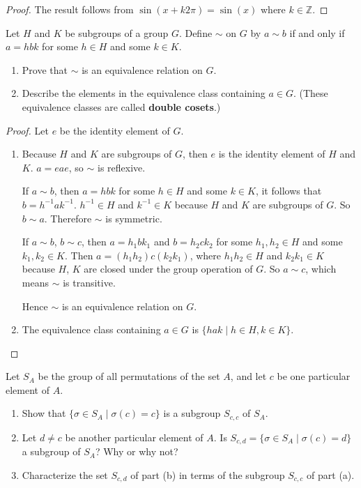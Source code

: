 \begin{proof}
    The result follows from $\sin(x + k2\pi) = \sin(x)$ where $k\in\mathbb{Z}$.
\end{proof}

\newpage
\begin{exercise}
    Let $H$ and $K$ be subgroups of a group $G$. Define $\sim$ on $G$ by $a\sim b$ if and only if $a = hbk$ for some $h\in H$ and some $k\in K$.
    \begin{enumerate}[label={\textbf{\alph*.}}]
        \item Prove that $\sim$ is an equivalence relation on $G$.
        \item Describe the elements in the equivalence class containing $a\in G$. (These equivalence classes are called \textbf{double cosets}.)
    \end{enumerate}
\end{exercise}

\begin{proof}
    Let $e$ be the identity element of $G$.
    \begin{enumerate}[label={\textbf{\alph*.}}]
        \item Because $H$ and $K$ are subgroups of $G$, then $e$ is the identity element of $H$ and $K$. $a = eae$, so $\sim$ is reflexive.

              If $a\sim b$, then $a = hbk$ for some $h\in H$ and some $k\in K$, it follows that $b = h^{-1}ak^{-1}$. $h^{-1}\in H$ and $k^{-1}\in K$ because $H$ and $K$ are subgroups of $G$. So $b\sim a$. Therefore $\sim$ is symmetric.

              If $a\sim b$, $b\sim c$, then $a = h_{1}bk_{1}$ and $b = h_{2}ck_{2}$ for some $h_{1}, h_{2}\in H$ and some $k_{1}, k_{2}\in K$. Then $a = (h_{1}h_{2})c(k_{2}k_{1})$, where $h_{1}h_{2}\in H$ and $k_{2}k_{1}\in K$ because $H$, $K$ are closed under the group operation of $G$. So $a\sim c$, which means $\sim$ is transitive.

              Hence $\sim$ is an equivalence relation on $G$.
        \item The equivalence class containing $a\in G$ is $\{ hak \mid h\in H, k\in K \}$.
    \end{enumerate}
\end{proof}

\newpage
\begin{exercise}
    Let $S_{A}$ be the group of all permutations of the set $A$, and let $c$ be one particular element of $A$.
    \begin{enumerate}[label={\textbf{\alph*.}}]
        \item Show that $\{ \sigma\in S_{A} \mid \sigma(c) = c \}$ is a subgroup $S_{c,c}$ of $S_{A}$.
        \item Let $d\ne c$ be another particular element of $A$. Is $S_{c,d} = \{ \sigma\in S_{A} \mid \sigma(c) = d \}$ a subgroup of $S_{A}$? Why or why not?
        \item Characterize the set $S_{c,d}$ of part (b) in terms of the subgroup $S_{c,c}$ of part (a).
    \end{enumerate}
\end{exercise}

